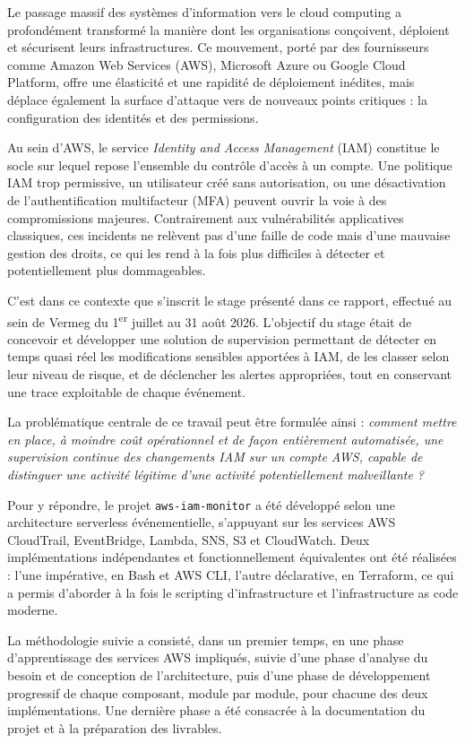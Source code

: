 \documentclass[11pt,a4paper]{report}
\begin{document}
Le passage massif des systèmes d'information vers le cloud computing a profondément transformé la manière dont les organisations conçoivent, déploient et sécurisent leurs infrastructures. Ce mouvement, porté par des fournisseurs comme Amazon Web Services (AWS), Microsoft Azure ou Google Cloud Platform, offre une élasticité et une rapidité de déploiement inédites, mais déplace également la surface d'attaque vers de nouveaux points critiques : la configuration des identités et des permissions.

Au sein d'AWS, le service \textit{Identity and Access Management} (IAM) constitue le socle sur lequel repose l'ensemble du contrôle d'accès à un compte. Une politique IAM trop permissive, un utilisateur créé sans autorisation, ou une désactivation de l'authentification multifacteur (MFA) peuvent ouvrir la voie à des compromissions majeures. Contrairement aux vulnérabilités applicatives classiques, ces incidents ne relèvent pas d'une faille de code mais d'une mauvaise gestion des droits, ce qui les rend à la fois plus difficiles à détecter et potentiellement plus dommageables.

C'est dans ce contexte que s'inscrit le stage présenté dans ce rapport, effectué au sein de Vermeg du 1\textsuperscript{er} juillet au 31 août 2026. L'objectif du stage était de concevoir et développer une solution de supervision permettant de détecter en temps quasi réel les modifications sensibles apportées à IAM, de les classer selon leur niveau de risque, et de déclencher les alertes appropriées, tout en conservant une trace exploitable de chaque événement.

La problématique centrale de ce travail peut être formulée ainsi : \textit{comment mettre en place, à moindre coût opérationnel et de façon entièrement automatisée, une supervision continue des changements IAM sur un compte AWS, capable de distinguer une activité légitime d'une activité potentiellement malveillante ?}

Pour y répondre, le projet \texttt{aws-iam-monitor} a été développé selon une architecture serverless événementielle, s'appuyant sur les services AWS CloudTrail, EventBridge, Lambda, SNS, S3 et CloudWatch. Deux implémentations indépendantes et fonctionnellement équivalentes ont été réalisées : l'une impérative, en Bash et AWS CLI, l'autre déclarative, en Terraform, ce qui a permis d'aborder à la fois le scripting d'infrastructure et l'infrastructure as code moderne.

La méthodologie suivie a consisté, dans un premier temps, en une phase d'apprentissage des services AWS impliqués, suivie d'une phase d'analyse du besoin et de conception de l'architecture, puis d'une phase de développement progressif de chaque composant, module par module, pour chacune des deux implémentations. Une dernière phase a été consacrée à la documentation du projet et à la préparation des livrables.
\end{document}
